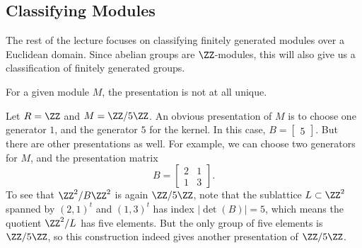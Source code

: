 


\subsection{Classifying Modules}

The rest of the lecture focuses on classifying finitely generated modules over a Euclidean domain. Since abelian groups are $\ZZ$-modules, this will also give us a classification of finitely generated groups. 

For a given module $M$, the presentation is not at all unique. 

\begin{example}
Let $R = \ZZ$ and $M = \ZZ/5\ZZ$. An obvious presentation of $M$ is to choose one generator $1$, and the generator $5$ for the kernel. In this case, $B = \begin{bmatrix} 5 \end{bmatrix}$. 
But there are other presentations as well. For example, we can choose two generators for $M$, and the presentation matrix \[B = \begin{bmatrix} 2 & 1 \\ 1 & 3 \end{bmatrix}.\] To see that $\ZZ^2/B\ZZ^2$ is again $\ZZ/5\ZZ$, note that the sublattice $L \subset \ZZ^2$ spanned by $(2, 1)^t$ and $(1, 3)^t$ has index $\lvert \det(B) \rvert = 5$, which means the quotient $\ZZ^2/L$ has five elements. But the only group of five elements is $\ZZ/5\ZZ$, so this construction indeed gives another presentation of $\ZZ/5\ZZ$. 

\end{example}


